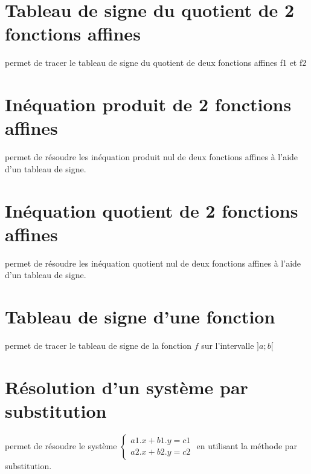 \section{Tableau de signe du quotient de 2 fonctions affines}
 permet de tracer le tableau de signe du quotient de deux fonctions affines f1 et f2

\section{Inéquation produit de 2 fonctions affines}
 permet de résoudre les inéquation produit nul de deux fonctions affines à l'aide d'un tableau de signe.
\section{Inéquation quotient de 2 fonctions affines}
 permet de résoudre les inéquation quotient nul de deux fonctions affines à l'aide d'un tableau de signe.

\section{Tableau de signe d'une fonction}
 permet de tracer le tableau de signe de la fonction $f$ sur l'intervalle $]a;b[$ 
\section{Résolution d'un système par substitution}
 permet de résoudre le système 
$\left \{\begin{matrix}a1.x+b1.y=c1 \\a2.x+b2.y=c2 \end{matrix}\right.$ en utilisant la méthode par substitution.

